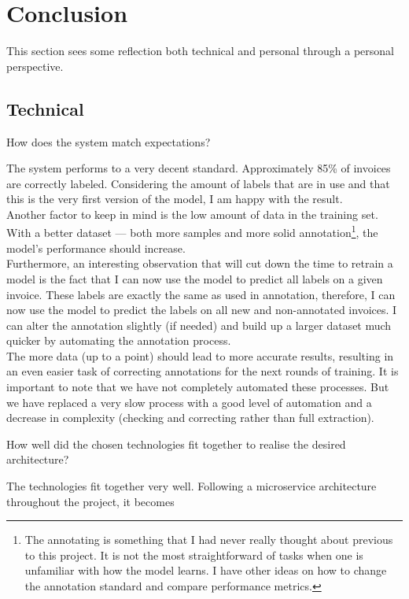 
\chapter{Conclusion}
\label{chap:conclusion}
This section sees some reflection both technical and personal through a personal perspective.
\section{Technical}

\begin{quoting}
How does the system match expectations?
\end{quoting}
The system performs to a very decent standard. Approximately 85\% of invoices are correctly labeled. Considering the amount of labels 
that are in use and that this is the very first version of the model, I am happy with the result.\\
Another factor to keep in mind is the low amount of data in the training set. With a better dataset --- both more samples 
and more solid annotation\footnote{The annotating is something that I had never really thought about previous to this project.
It is not the most straightforward of tasks when one is unfamiliar with how the model learns. I have other ideas on how to change 
the annotation standard and compare performance metrics.}, the model's performance should increase. \\
Furthermore, an interesting observation that will cut down the time to retrain a model is the fact that I can now use 
the model to predict all labels on a given invoice. These labels are exactly the same as used in annotation,
therefore, I can now use the model to predict the labels on all new and non-annotated invoices. I can 
alter the annotation slightly (if needed) and build up a larger dataset much quicker by automating the annotation process.\\
The more data (up to a point) should lead to more accurate results, resulting in an even easier task of correcting annotations 
for the next rounds of training.
\bigbreak
It is important to note that we have not completely automated these processes. But we have replaced a very slow process 
with a good level of automation and a decrease in complexity (checking and correcting rather than full extraction).
\begin{quoting}
How well did the chosen technologies fit together to realise the desired architecture?
\end{quoting}
The technologies fit together very well. Following a microservice architecture throughout the project, it becomes 
